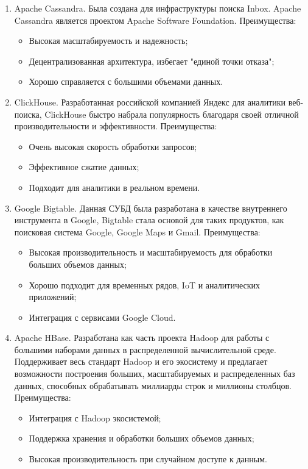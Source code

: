 \documentclass[14pt, russian]{scrartcl}
\begin{document}
\begin{enumerate}
	\item{Apache Cassandra. Была создана для инфраструктуры поиска Inbox. Apache Cassandra является проектом Apache Software Foundation. Преимущества:
	      \begin{itemize}
		      \item Высокая масштабируемость и надежность;
		      \item Децентрализованная архитектура, избегает "единой точки отказа";
		      \item Хорошо справляется с большими объемами данных.
	      \end{itemize}}
	\item{ClickHouse. Разработанная российской компанией Яндекс для аналитики веб-поиска, ClickHouse быстро набрала популярность благодаря своей отличной производительности и эффективности. Преимущества:
	      \begin{itemize}
		      \item Очень высокая скорость обработки запросов;
		      \item Эффективное сжатие данных;
		      \item Подходит для аналитики в реальном времени.
	      \end{itemize}}

	\item{Google Bigtable. Данная СУБД была разработана в качестве внутреннего инструмента в Google, Bigtable стала основой для таких продуктов, как поисковая система Google, Google Maps и Gmail. Преимущества:
	      \begin{itemize}
		      \item Высокая производительность и масштабируемость для обработки больших объемов данных;
		      \item Хорошо подходит для временных рядов, IoT и аналитических приложений;
		      \item Интеграция с сервисами Google Cloud.
	      \end{itemize}
	      }
	\item{Apache HBase. Разработана как часть проекта Hadoop для работы с большими наборами данных в распределенной вычислительной среде. Поддерживает весь стандарт Hadoop и его экосистему и предлагает возможности построения больших, масштабируемых и распределенных баз данных, способных обрабатывать миллиарды строк и миллионы столбцов. Преимущества:
	      \begin{itemize}
		      \item Интеграция с Hadoop экосистемой;
		      \item Поддержка хранения и обработки больших объемов данных;
		      \item Высокая производительность при случайном доступе к данным.
	      \end{itemize}
	      }



\end{enumerate}
\end{document}
